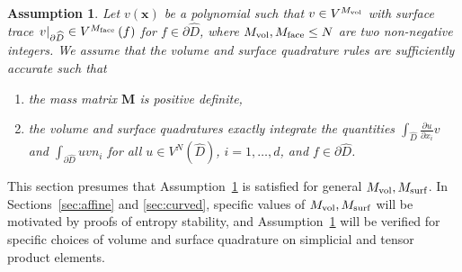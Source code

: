 \documentclass[review]{siamart0216}
\theoremstyle{assumption}
\newtheorem{assumption}{Assumption}
\renewcommand{\hat}[1]{\hat{#1}}
\newcommand{\pd}[2]{\frac{\partial#1}{\partial#2}}
\newcommand{\LRp}[1]{\left( #1 \right)}
\newcommand{\LRl}[1]{\left. #1 \right|}
\renewcommand{\hat}{\widehat}
\newcommand{\diag}[1]{{\rm diag}\LRp{#1}}
\begin{document}
\begin{assumption}
\label{ass:quad}
Let $v(\bm{x})$ be a polynomial such that $v \in V^{M_{\rm vol}}$ with surface trace $\LRl{v}_{\partial \hat{D}} \in V^{M_{\rm face}}\LRp{f}$ for $f \in \partial \hat{D}$, where $M_{\rm vol}, M_{\rm face} \leq N$ are two non-negative integers.  We assume that the volume and surface quadrature rules are sufficiently accurate such that
\begin{enumerate}
\item the mass matrix $\bm{M}$ is positive definite, 
\item the volume and surface quadratures exactly integrate the quantities $\int_{\hat{D}} \pd{u}{x_i} v$ and $\int_{\partial \hat{D}} u v n_i$ for all $u \in V^N\LRp{\hat{D}}$, $i = 1,\ldots, d$, and $f \in \partial \hat{D}$.  
\end{enumerate}
\end{assumption}

This section presumes that Assumption~\ref{ass:quad} is satisfied for general  $M_{\rm vol}, M_{\rm surf}$.  In Sections~\ref{sec:affine} and \ref{sec:curved}, specific values of $M_{\rm vol}, M_{\rm surf}$ will be motivated by proofs of entropy stability, and Assumption~\ref{ass:quad} will be verified for specific choices of volume and surface quadrature on simplicial and tensor product elements.
\end{document}
